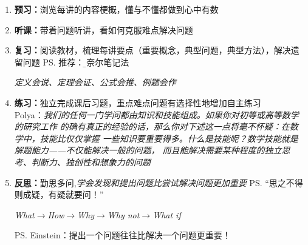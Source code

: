 \begin{itemize}
	\begin{enumerate}
	  \item {\bf 预习：}浏览每讲的内容梗概，懂与不懂都做到心中有数
	  \item {\bf 听课：}带着问题听讲，看如何克服难点解决问题
	  \item {\bf 复习：}阅读教材，梳理每讲要点（重要概念，典型问题，典型方法），解决遗留问题
	  \ps{推荐：\b 康奈尔笔记法}\\
	  \centerline{\it 定义会说、定理会证、公式会推、例题会作}
	  \item {\bf 练习：}独立完成课后习题，重点难点问题有选择性地增加自主练习\\
	  Polya：{\it 我们的任何一门学问都由知识和技能组成。如果你对初等或高等数学的研究工作
	  的确有真正的经验的话，那么你对下述这一点将毫不怀疑：在数学中，技能比仅仅掌握
	  一些知识要重要得多。什么是技能呢？数学技能就是解题能力——不仅能解决一般的问题，
	  而且能解决需要某种程度的独立思考、判断力、独创性和想象力的问题}
	  \item {\bf 反思：}勤思多问,{\it 学会发现和提出问题比尝试解决问题更加重要}
	  \ps{“思之不得则成疑，有疑就要问！”}\\
	  \centerline{\it What$\to$How$\to$Why$\to$Why not$\to$What if}
	  \ps{Einstein：提出一个问题往往比解决一个问题更重要！}
	\end{enumerate}
\end{itemize}

